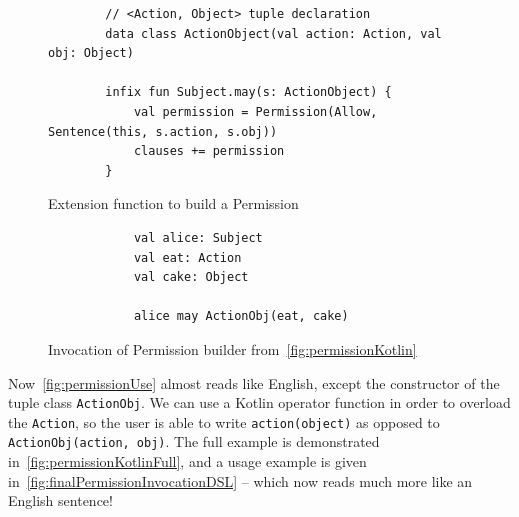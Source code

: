 \begin{figure}[h]
    \centering
    \begin{minipage}{\textwidth}
        \begin{verbatim}
        // <Action, Object> tuple declaration
        data class ActionObject(val action: Action, val obj: Object)

        infix fun Subject.may(s: ActionObject) {
            val permission = Permission(Allow, Sentence(this, s.action, s.obj))
            clauses += permission
        }
        \end{verbatim}
    \end{minipage}
    \caption{Extension function to build a Permission}\label{fig:permissionKotlin}
\end{figure}



\begin{figure}[h]
    \centering
    \begin{minipage}{0.5\textwidth}
        \begin{verbatim}
            val alice: Subject
            val eat: Action
            val cake: Object

            alice may ActionObj(eat, cake)
        \end{verbatim}
    \end{minipage}
    \caption{Invocation of Permission builder from~\autoref{fig:permissionKotlin}}
    \label{fig:permissionUse}
\end{figure}

Now~\autoref{fig:permissionUse} almost reads like English, except the constructor of the tuple class \texttt{ActionObj}.
We can use a Kotlin operator function in order to overload the \texttt{Action}, so the user is able to write \texttt{action(object)} as opposed to \texttt{ActionObj(action, obj)}.
The full example is demonstrated in~\autoref{fig:permissionKotlinFull}, and a usage example is given in~\autoref{fig:finalPermissionInvocationDSL} -- which now reads much more like an English sentence!


